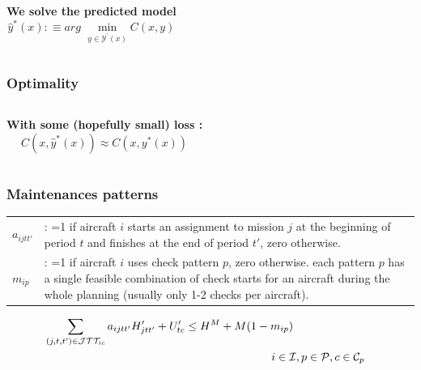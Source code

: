 \begin{frame}
{  \begin{columns}[c]
    \textbf{We solve the predicted model}
    \begin{equation*}
      \hat{y}^{*}(x) :\equiv arg \,\,\min_{y \in \mathcal{Y}^\prime(x)} C(x,y)          
    \end{equation*}
  \end{columns}
  }
\end{frame}

\begin{frame}
  \frametitle{\textbf{Optimality}}

  \begin{columns}[c]
    \textbf{With some (hopefully small) loss :}
    \begin{equation*}
      C(x,\hat{y}^{*}(x)) \approx  C(x,y^{*}(x))
    \end{equation*}
  \end{columns}
\end{frame}

\begin{frame}
\frametitle{\textbf{Maintenances patterns}}

  \begin{tabular}{p{15mm}p{110mm}}
    $a_{ijtt'}$ & : =1 if aircraft $i$ starts an assignment to mission $j$ at the beginning of period $t$ and finishes at the end of period $t'$, zero otherwise.  \\
    $m_{ip}$ &: =1 if aircraft $i$ uses check pattern $p$, zero otherwise.
   each pattern $p$ has a single feasible combination of check starts for an aircraft during the whole planning (usually only 1-2 checks per aircraft). \\
  \end{tabular}

  \begin{align}
    & \sum_{(j, t, t') \in \mathcal{J}\mathcal{T}\mathcal{T}_{ic}} a_{ijtt'} H^\prime_{jtt'} + U^{\prime}_{tc} \leq H^{M} + M (1 - m_{ip}) & \notag \\
    & \hspace{200px}  i \in \mathcal{I}, p \in \mathcal{P}, c \in \mathcal{C}_p \label{eq:cycle_hours2}\\
  \end{align}

\end{frame}

